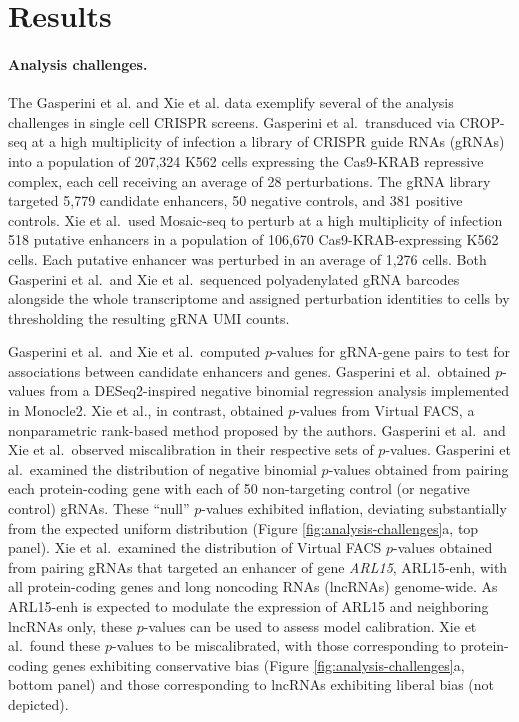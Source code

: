 \documentclass{nature}
\begin{document}
\section*{Results}

\paragraph{Analysis challenges.} 

The Gasperini et al.\cite{Gasperini2019} and Xie et al.\cite{Xie2019} data exemplify several of the analysis challenges in single cell CRISPR screens. Gasperini et al.\ transduced via CROP-seq\cite{Datlinger2017,Hill2018}  at a high multiplicity of infection a library of CRISPR guide RNAs (gRNAs) into a population of 207,324 K562 cells expressing the Cas9-KRAB repressive complex, each cell receiving an average of 28 perturbations. The gRNA library targeted 5,779 candidate enhancers, 50 negative controls, and 381 positive controls. Xie et al.\ used Mosaic-seq\cite{Xie2019,Xie2017} to perturb at a high multiplicity of infection 518 putative enhancers in a population of 106,670 Cas9-KRAB-expressing K562 cells. Each putative enhancer was perturbed in an average of 1,276 cells. Both Gasperini et al.\ and Xie et al.\ sequenced polyadenylated gRNA barcodes alongside the whole transcriptome and assigned perturbation identities to cells by thresholding the resulting gRNA UMI counts.

Gasperini et al.\ and Xie et al.\ computed $p$-values for gRNA-gene pairs
to test for associations between candidate enhancers and genes. Gasperini et al.\ obtained $p$-values from a DESeq2\cite{Love2014}-inspired negative binomial regression analysis implemented in Monocle2.\cite{Qiu2017} Xie et al., in contrast, obtained $p$-values from Virtual FACS, a nonparametric rank-based method proposed by the authors.\cite{Xie2017} Gasperini et al.\ and Xie et al.\  observed miscalibration in their respective sets of $p$-values. Gasperini et al.\ examined the distribution of negative binomial $p$-values obtained from pairing each protein-coding gene with each of 50 non-targeting control (or negative control) gRNAs. These ``null'' $p$-values exhibited inflation, deviating substantially from the expected uniform distribution (Figure \ref{fig:analysis-challenges}a, top panel). Xie et al.\ examined the distribution of Virtual FACS $p$-values obtained from pairing gRNAs that targeted an enhancer of gene \textit{ARL15}, ARL15-enh, with all protein-coding genes and long noncoding RNAs (lncRNAs) genome-wide. As ARL15-enh is expected to modulate the expression of ARL15 and neighboring lncRNAs only, these $p$-values can be used to assess model calibration. Xie et al.\
 found these $p$-values to be miscalibrated, with those corresponding to protein-coding genes exhibiting conservative bias (Figure \ref{fig:analysis-challenges}a, bottom panel) and those corresponding to lncRNAs exhibiting liberal bias (not depicted).
 
\end{document}
